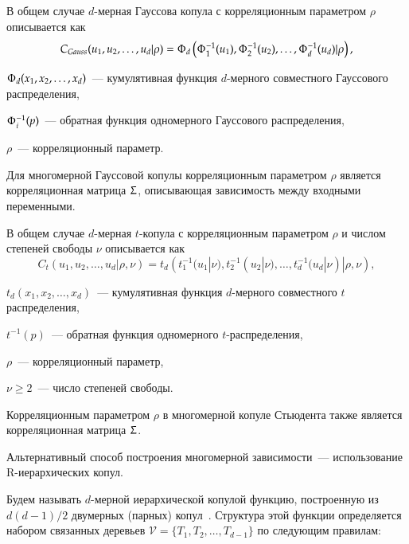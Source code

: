 В общем случае $d$-мерная Гауссова копула с корреляционным параметром $\rho$ описывается как~\cite{Emb2001}
\begin{equation} \label{nCop}
C_{Gauss}(u_1, u_2,\ldots, u_d|\rho) = \Upphi_d \left( \Upphi_1^{-1} (u_1), \Upphi_2^{-1} (u_2), \ldots, \Upphi_d^{-1} (u_d) | \rho \right),
\end{equation}
\begin{where}
    \item $\Upphi_d(x_1, x_2, \dots, x_d)$~--- кумулятивная функция $d$-мерного совместного Гауссового распределения,
    \item $\Upphi_i^{-1}(p)$~--- обратная функция одномерного Гауссового распределения,
    \item $\rho$~--- корреляционный параметр.
\end{where}
%
Для многомерной Гауссовой копулы корреляционным параметром $\rho$ является корреляционная матрица $\Upsigma$, описывающая зависимость между входными переменными.

В общем случае $d$-мерная $t$-копула с корреляционным параметром $\rho$ и числом степеней свободы $\nu$ описывается как~\cite{Emb2001}
\begin{equation} \label{tCop}
C_{t}(u_1, u_2,\ldots, u_d|\rho, \nu) = t_d \left( t_1^{-1} (u_1|\nu), t_2^{-1} (u_2|\nu), \ldots, t_d^{-1} (u_d|\nu) | \rho, \nu \right),
\end{equation}
\begin{where}
    \item $t_d(x_1, x_2, \dots,x_d)$~--- кумулятивная функция $d$-мерного совместного $t$\-распределения,
    \item $t^{-1}(p)$~--- обратная функция одномерного $t$-распределения,
    \item $\rho$~--- корреляционный параметр,
    \item $\nu \ge 2$~--- число степеней свободы.
\end{where}

Корреляционным параметром $\rho$ в многомерной копуле Стьюдента также является корреляционная матрица $\Upsigma$.

Альтернативный способ построения многомерной зависимости~--- использование R-иерархических копул. 

Будем называть $d$-мерной иерархической копулой функцию, построенную из $d(d - 1)/2$  двумерных (парных) копул~\cite{Bedfort2002}. Структура этой функции определяется набором связанных деревьев $\mathcal{V} =\{T_1, T_2, \ldots, T_ {d-1}\}$ по следующим правилам:

